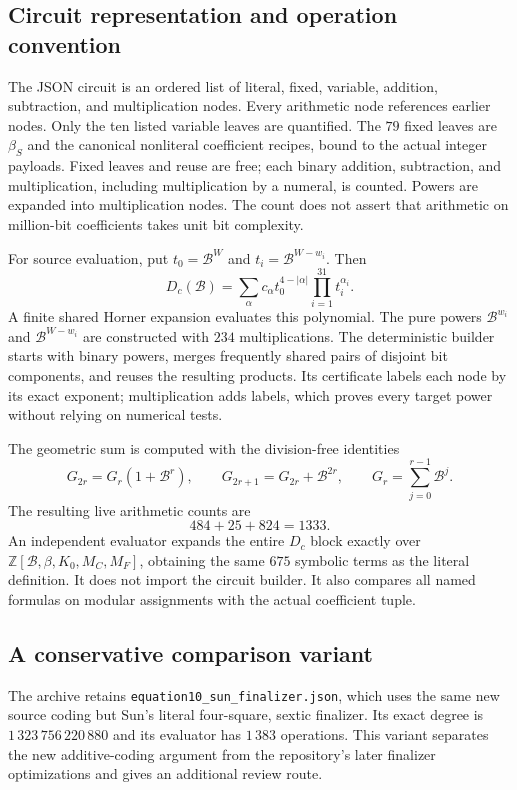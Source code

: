 \documentclass[11pt,letterpaper]{article}
\newcommand{\Z}{\mathbb Z}
\newcommand{\B}{\mathcal B}
\theoremstyle{remark}
\begin{document}
\subsection{Circuit representation and operation convention}

The JSON circuit is an ordered list of literal, fixed, variable,
addition, subtraction, and multiplication nodes. Every arithmetic
node references earlier nodes. Only the ten listed variable leaves
are quantified. The \(79\) fixed leaves are \(\beta_S\) and the
canonical nonliteral coefficient recipes, bound to the actual
integer payloads. Fixed leaves and reuse are free; each binary
addition, subtraction, and multiplication, including multiplication
by a numeral, is counted. Powers are expanded into multiplication
nodes. The count does not assert that arithmetic on million-bit
coefficients takes unit bit complexity.

For source evaluation, put \(t_0=\B^W\) and
\(t_i=\B^{W-w_i}\). Then
\[
D_c(\B)=
\sum_\alpha c_\alpha t_0^{4-|\alpha|}
                       \prod_{i=1}^{31}t_i^{\alpha_i}.
\]
A finite shared Horner expansion evaluates this polynomial.
The pure powers \(\B^{w_i}\) and \(\B^{W-w_i}\) are constructed
with \(234\) multiplications. The deterministic builder starts with
binary powers, merges frequently shared pairs of disjoint bit
components, and reuses the resulting products. Its certificate
labels each node by its exact exponent; multiplication adds labels,
which proves every target power without relying on numerical tests.

The geometric sum is computed with the division-free identities
\[
G_{2r}=G_r(1+\B^r),\qquad
G_{2r+1}=G_{2r}+\B^{2r},\qquad
G_r=\sum_{j=0}^{r-1}\B^j.
\]
The resulting live arithmetic counts are
\[
484+25+824=\boxed{1333}.
\]
An independent evaluator expands the entire \(D_c\) block exactly
over \(\Z[\B,\beta,K_0,M_C,M_F]\), obtaining the same \(675\)
symbolic terms as the literal definition. It does not import the
circuit builder. It also compares all named formulas on modular
assignments with the actual coefficient tuple.

\subsection{A conservative comparison variant}

The archive retains \texttt{equation10\_sun\_finalizer.json}, which uses
the same new source coding but Sun's literal four-square, sextic
finalizer. Its exact degree is \(1\,323\,756\,220\,880\) and its
evaluator has \(1\,383\) operations. This variant separates the new
additive-coding argument from the repository's later finalizer
optimizations and gives an additional review route.
\end{document}
